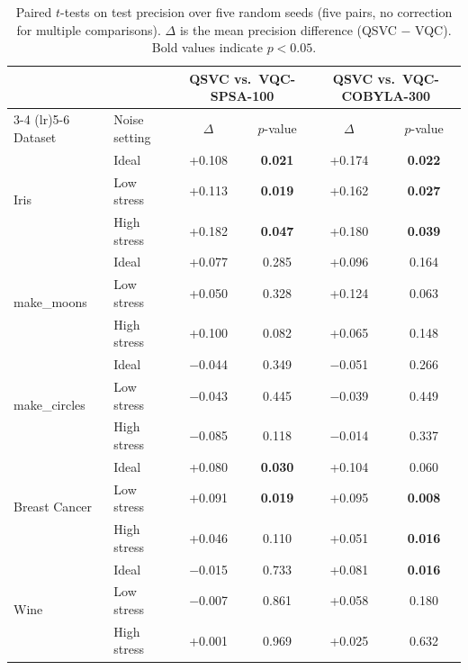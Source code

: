 \documentclass[12pt,a4paper]{article}
\newcommand{\chgcolor}{blue}
\begin{document}
\begin{table}[H]
  \centering
  \caption{Paired $t$-tests on test precision over five random seeds (five pairs, no correction for multiple comparisons). $\Delta$ is the mean precision difference (QSVC $-$ VQC). Bold values indicate $p < 0.05$.}
  \label{tab:ttest_precision}
  \footnotesize
  \setlength{\tabcolsep}{5pt}
  \renewcommand{\arraystretch}{1.2}
  {\color{\chgcolor}\begin{tabular}{llcccc}
    \toprule
    & & \multicolumn{2}{c}{QSVC vs.\ VQC-SPSA-100} & \multicolumn{2}{c}{QSVC vs.\ VQC-COBYLA-300} \\
    \cmidrule(lr){3-4} \cmidrule(lr){5-6}
    Dataset & Noise setting & $\Delta$ & $p$-value & $\Delta$ & $p$-value \\
    \midrule
    \multirow{3}{*}{Iris} & Ideal & +0.108 & \textbf{0.021} & +0.174 & \textbf{0.022} \\
  & Low stress & +0.113 & \textbf{0.019} & +0.162 & \textbf{0.027} \\
  & High stress & +0.182 & \textbf{0.047} & +0.180 & \textbf{0.039} \\
    \midrule
    \multirow{3}{*}{make\_moons} & Ideal & +0.077 & 0.285 & +0.096 & 0.164 \\
  & Low stress & +0.050 & 0.328 & +0.124 & 0.063 \\
  & High stress & +0.100 & 0.082 & +0.065 & 0.148 \\
    \midrule
    \multirow{3}{*}{make\_circles} & Ideal & $-$0.044 & 0.349 & $-$0.051 & 0.266 \\
  & Low stress & $-$0.043 & 0.445 & $-$0.039 & 0.449 \\
  & High stress & $-$0.085 & 0.118 & $-$0.014 & 0.337 \\
    \midrule
    \multirow{3}{*}{Breast Cancer} & Ideal & +0.080 & \textbf{0.030} & +0.104 & 0.060 \\
  & Low stress & +0.091 & \textbf{0.019} & +0.095 & \textbf{0.008} \\
  & High stress & +0.046 & 0.110 & +0.051 & \textbf{0.016} \\
    \midrule
    \multirow{3}{*}{Wine} & Ideal & $-$0.015 & 0.733 & +0.081 & \textbf{0.016} \\
  & Low stress & $-$0.007 & 0.861 & +0.058 & 0.180 \\
  & High stress & +0.001 & 0.969 & +0.025 & 0.632 \\
    \bottomrule
  \end{tabular}}
\end{table}
\end{document}
